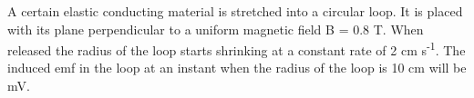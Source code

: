 \item A certain elastic conducting material is stretched into a circular loop. It is placed with its plane perpendicular to a uniform magnetic field B = 0.8 T. When released the radius of the loop starts shrinking at a constant rate of 2 cm s\textsuperscript{-1}. The induced emf in the loop at an instant when the radius of the loop is 10 cm will be \underline{\hspace{2.5cm}} mV.